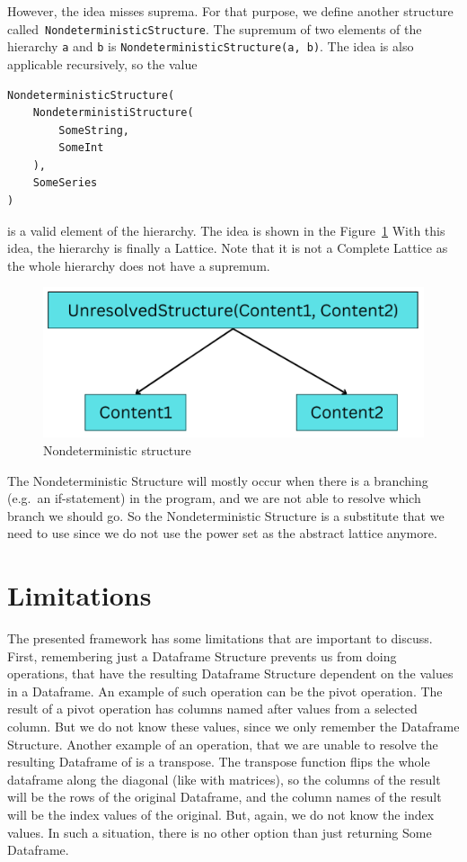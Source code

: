 However, the idea misses suprema.
For that purpose, we define another structure called~\verb|NondeterministicStructure|.
The supremum of two elements of the hierarchy \verb|a| and \verb|b| is \verb|NondeterministicStructure(a, b)|.
The idea is also applicable recursively, so the value \\
\begin{verbatim}
NondeterministicStructure(
    NondeterministiStructure(
        SomeString,
        SomeInt
    ),
    SomeSeries
)
\end{verbatim}
is a valid element of the hierarchy.
The idea is shown in the Figure~\ref{fig:nondeterministic_structure}
With this idea, the hierarchy is finally a Lattice.
Note that it is not a Complete Lattice as the whole hierarchy does not have a supremum.

\begin{figure}[H]
    \caption{Nondeterministic structure}
    \label{fig:nondeterministic_structure}
    \centering
    \includegraphics[scale=0.5]{img/unresolved_structure}
\end{figure}

The Nondeterministic Structure will mostly occur when there is a branching (e.g.~an if-statement) in the program, and we
are not able to resolve which branch we should go.
So the Nondeterministic Structure is a substitute that we need to use since we do not use the power set as the abstract
lattice anymore.


\section{Limitations}

The presented framework has some limitations that are important to discuss.
First, remembering just a Dataframe Structure prevents us from doing operations, that have the resulting Dataframe
Structure dependent on the values in a Dataframe.
An example of such operation can be the pivot operation.
The result of a pivot operation has columns named after values from a selected column.
But we do not know these values, since we only remember the Dataframe Structure.
Another example of an operation, that we are unable to resolve the resulting Dataframe of is a transpose.
The transpose function flips the whole dataframe along the diagonal (like with matrices), so the columns of the result
will be the rows of the original Dataframe, and the column names of the result will be the index values of the original.
But, again, we do not know the index values.
In such a situation, there is no other option than just returning Some Dataframe.

